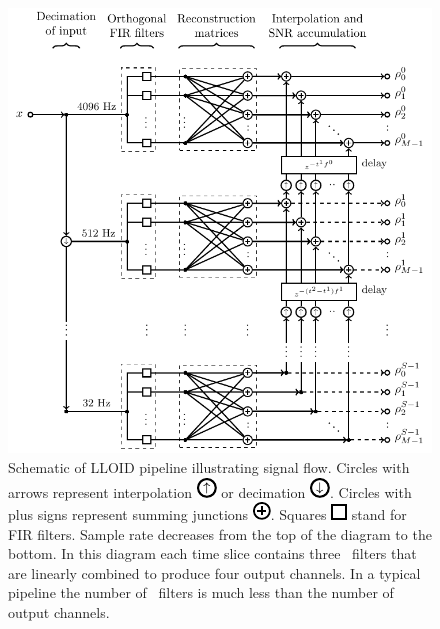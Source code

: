 \begin{figure}[htbp]
	\includegraphics{figures/lloid-diagram.pdf}
	\caption{\label{fig:pipeline} Schematic of LLOID pipeline illustrating
signal flow.  Circles with arrows represent interpolation
\protect\includegraphics{figures/upsample-symbol.pdf} or decimation
\protect\includegraphics{figures/downsample-symbol.pdf}.  Circles with plus
signs represent summing junctions
\protect\includegraphics{figures/adder-symbol.pdf}.  Squares
\protect\includegraphics{figures/fir-symbol.pdf} stand for FIR filters.  Sample
rate decreases from the top of the diagram to the bottom.  In this diagram each
time slice contains three \fir\ filters that are linearly combined to produce
four output channels.  In a typical pipeline the number of \fir\ filters is
much less than the number of output channels.}
\end{figure}

